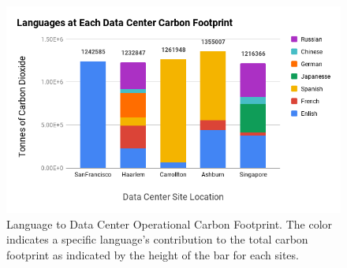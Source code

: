 \begin{figure}[h!]\centering
    \includegraphics[scale=0.65]{embodied_cost_model/images/Languages at Each Data Center Carbon Footprint.png}
    \caption[Language to Data Center Carbon Footprint]{Language to Data Center Operational Carbon Footprint. The color indicates a specific language's contribution to the total carbon footprint as indicated by the height of the bar for each sites.
    }
    \label{stacked_langs_at_dcs}
\end{figure}

